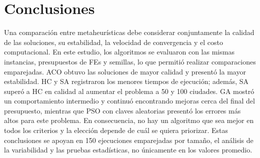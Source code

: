 \documentclass[10pt,a4paper]{article}
\begin{document}
\section{Conclusiones}
Una comparación entre metaheurísticas debe considerar conjuntamente la calidad de las soluciones, su estabilidad, la velocidad de convergencia y el costo computacional. En este estudio, los algoritmos se evaluaron con las mismas instancias, presupuestos de FEs y semillas, lo que permitió realizar comparaciones emparejadas.
ACO obtuvo las soluciones de mayor calidad y presentó la mayor estabilidad. HC y SA registraron los menores tiempos de ejecución; además, SA superó a HC en calidad al aumentar el problema a 50 y 100 ciudades. GA mostró un comportamiento intermedio y continuó encontrando mejoras cerca del final del presupuesto, mientras que PSO con claves aleatorias presentó los errores más altos para este problema.
En consecuencia, no hay un algoritmo que sea mejor en todos los criterios y la elección depende de cuál se quiera priorizar. Estas conclusiones se apoyan en 150 ejecuciones emparejadas por tamaño, el análisis de la variabilidad y las pruebas estadísticas, no únicamente en los valores promedio.
\end{document}
